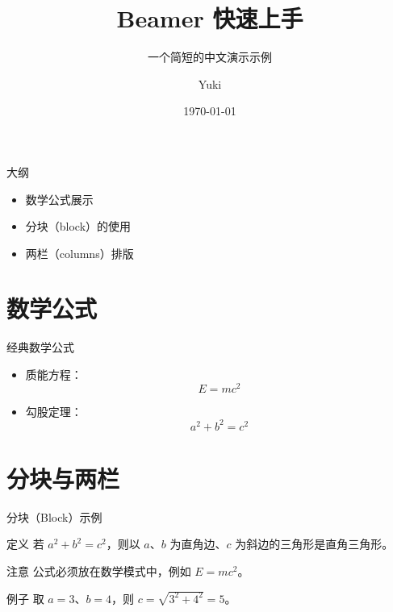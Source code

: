 \documentclass[aspectratio=169]{ctexbeamer}
\title{Beamer 快速上手}
\subtitle{一个简短的中文演示示例}
\author{Yuki}
\institute{小女仆工作室}
\date{\today}
\begin{document}
\begin{frame}
  \titlepage
\end{frame}

\begin{frame}{大纲}
  \tableofcontents
  \vspace{0.5em}
  \begin{itemize}
    \item 数学公式展示
    \item 分块（block）的使用
    \item 两栏（columns）排版
  \end{itemize}
\end{frame}

\section{数学公式}

\begin{frame}{经典数学公式}
  \begin{itemize}
    \item 质能方程：
      \begin{equation}
        E = mc^2
      \end{equation}
    \item 勾股定理：
      \begin{equation}
        a^2 + b^2 = c^2
      \end{equation}
  \end{itemize}
\end{frame}

\section{分块与两栏}

\begin{frame}{分块（Block）示例}
  \begin{block}{定义}
    若 $a^2 + b^2 = c^2$，则以 $a$、$b$ 为直角边、$c$ 为斜边的三角形是直角三角形。
  \end{block}
  \begin{alertblock}{注意}
    公式必须放在数学模式中，例如 $E = mc^2$。
  \end{alertblock}
  \begin{exampleblock}{例子}
    取 $a = 3$、$b = 4$，则 $c = \sqrt{3^2 + 4^2} = 5$。
  \end{exampleblock}
\end{frame}
\end{document}

